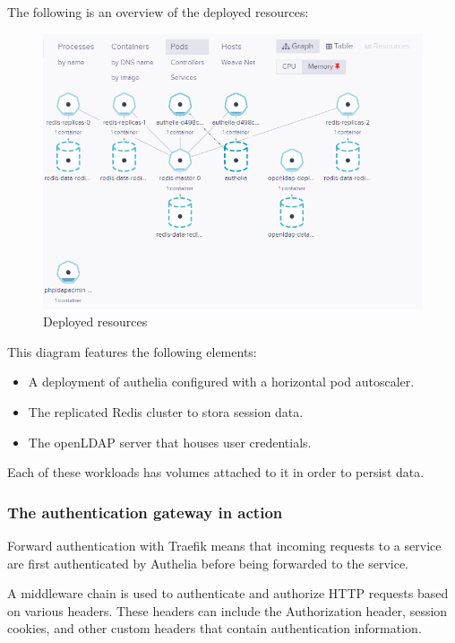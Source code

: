 The following is an overview of the deployed resources: 
\begin{figure}[H]\centering
\includegraphics[width=1.0\textwidth,angle=00]{assets/f54.png}
\caption{Deployed resources}
\label{fig:f54}
\end{figure}

This diagram features the following elements: 

\begin{itemize}[label={--}]
\item A deployment of authelia configured with a horizontal pod autoscaler.  
\item The replicated Redis cluster to stora session data. 
\item The openLDAP server that houses user credentials. 
\end{itemize}

Each of these workloads has volumes attached to it in order to persist data. 

\newpage

\subsubsection{The authentication gateway in action }

Forward authentication with Traefik means that incoming requests to a service are first authenticated by Authelia before being forwarded to the service.

A middleware chain is used to authenticate and authorize HTTP requests based on various headers. These headers can include the Authorization header, session cookies, and other custom headers that contain authentication information. 

